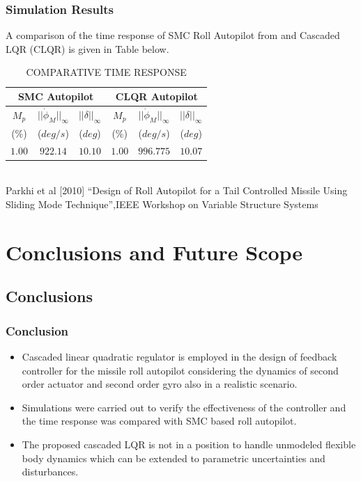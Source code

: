 \documentclass[10pt]{beamer}
\begin{document}
\begin{frame}
\frametitle{Simulation Results}
A comparison of the time response of SMC Roll Autopilot from \cite{parkhi2010} and Cascaded LQR (CLQR) is given in Table below.

\begin{table}[!h]
\renewcommand{\arraystretch}{1.6}
\caption{COMPARATIVE TIME RESPONSE}
\begin{center}
\begin{tabular}{|c|c|c||c|c|c|}
\hline
\multicolumn{3}{|c|}{\textbf{SMC Autopilot}} &\multicolumn{3}{|c|}{\textbf{CLQR Autopilot}}\\
\hline
\hline
$M_p$ & $||\dot \phi_M||_\infty$ & $||\delta||_\infty$ & $M_p$ & $||\dot \phi_M||_\infty$ & $||\delta||_\infty$
\\
\hline
(\%) & ($deg/s$) & ($deg$) & (\%) & ($deg/s$) & ($deg$) \\
\hline
$1.00$ & $922.14$ & $10.10$ & $1.00$ & $996.775$ & $10.07$\\
\hline
\end{tabular}
\label{tab1}\\
\vspace{.5cm}
\footnoterule
\tiny {\cite{parkhi2010} Parkhi et al [2010] ``Design of Roll Autopilot for a Tail Controlled Missile Using Sliding Mode Technique'',IEEE Workshop on Variable Structure Systems}
\end{center}
\end{table}

\end{frame}
\section{Conclusions and Future Scope}
\subsection{Conclusions}
\begin{frame}
 \frametitle{Conclusion}
 \begin{itemize}
 \item  Cascaded linear quadratic regulator is employed in the design of feedback controller for the missile roll autopilot considering the dynamics of second order actuator and second order gyro also in a realistic scenario.   \bigskip
  \item Simulations were carried out to verify the effectiveness of the controller and the time response was compared with SMC based roll autopilot. \bigskip
  \item The proposed cascaded LQR is not in a position to handle unmodeled flexible body dynamics which can be extended to parametric uncertainties and disturbances. \bigskip
  \end{itemize}
\end{frame}
\end{document}
